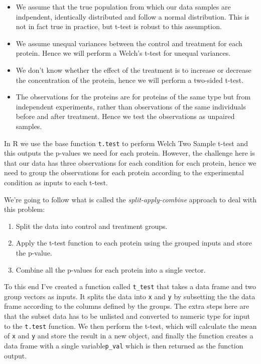 \documentclass[12pt,]{book}
\providecommand{\tightlist}{%
  \setlength{\itemsep}{0pt}\setlength{\parskip}{0pt}}
\theoremstyle{definition}
\theoremstyle{definition}
\theoremstyle{definition}
\theoremstyle{remark}
\begin{document}
\begin{itemize}
\item
  We assume that the true population from which our data samples are
  indpendent, identically distributed and follow a normal distribution.
  This is not in fact true in practice, but t-test is robust to this
  assumption.
\item
  We assume unequal variances between the control and treatment for each
  protein. Hence we will perform a Welch's t-test for unequal variances.
\item
  We don't know whether the effect of the treatment is to increase or
  decrease the concentration of the protein, hence we will perform a
  two-sided t-test.
\item
  The observations for the proteins are for proteins of the same type
  but from independent experiments, rather than observations of the same
  individuals before and after treatment. Hence we test the observations
  as unpaired samples.
\end{itemize}

In R we use the base function \texttt{t.test} to perform Welch Two
Sample t-test and this outputs the p-values we need for each protein.
However, the challenge here is that our data has three observations for
each condition for each protein, hence we need to group the observations
for each protein according to the experimental condition as inputs to
each t-test.

We're going to follow what is called the \emph{split-apply-combine}
approach to deal with this problem:

\begin{enumerate}
\def\labelenumi{\arabic{enumi}.}
\tightlist
\item
  Split the data into control and treatment groups.
\item
  Apply the t-test function to each protein using the grouped inputs and
  store the p-value.
\item
  Combine all the p-values for each protein into a single vector.
\end{enumerate}

To this end I've created a function called \texttt{t\_test} that takes a
data frame and two group vectors as inputs. It splits the data into
\texttt{x} and \texttt{y} by subsetting the the data frame according to
the columns defined by the groups. The extra steps here are that the
subset data has to be unlisted and converted to numeric type for input
to the \texttt{t.test} function. We then perform the t-test, which will
calculate the mean of \texttt{x} and \texttt{y} and store the result in
a new object, and finally the function creates a data frame with a
single variable\texttt{p\_val} which is then returned as the function
output.
\end{document}
